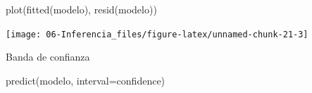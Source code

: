 \documentclass[
]{book}
\newenvironment{Shaded}{\begin{snugshade}}{\end{snugshade}}
\newcommand{\AttributeTok}[1]{\textcolor[rgb]{0.77,0.63,0.00}{#1}}
\newcommand{\FunctionTok}[1]{\textcolor[rgb]{0.00,0.00,0.00}{#1}}
\newcommand{\NormalTok}[1]{#1}
\newcommand{\StringTok}[1]{\textcolor[rgb]{0.31,0.60,0.02}{#1}}
\theoremstyle{break}
\begin{document}
\begin{Shaded}
\begin{Highlighting}[]
\FunctionTok{plot}\NormalTok{(}\FunctionTok{fitted}\NormalTok{(modelo), }\FunctionTok{resid}\NormalTok{(modelo))}
\end{Highlighting}
\end{Shaded}

\begin{center}\texttt{[image: 06-Inferencia\_files/figure-latex/unnamed-chunk-21-3]} \end{center}

Banda de confianza

\begin{Shaded}
\begin{Highlighting}[]
\FunctionTok{predict}\NormalTok{(modelo, }\AttributeTok{interval=}\StringTok{\textquotesingle{}confidence\textquotesingle{}}\NormalTok{)}
\end{Highlighting}
\end{Shaded}
\end{document}
